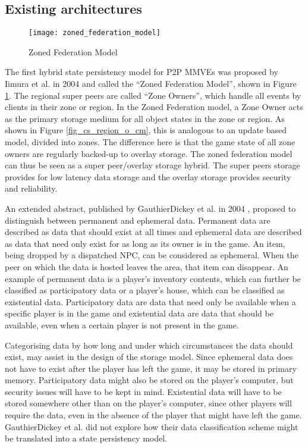 \subsection{Existing architectures}

\begin{figure}[htbp]
 \centering
 \texttt{[image: zoned\_federation\_model]}
 \caption{Zoned Federation Model \cite{zoned_federation}}
 \label{fig_zoned_federation_model}
\end{figure}
%
The first hybrid state persistency model for P2P MMVEs was proposed by Iimura et al. in 2004 \cite{zoned_federation} and called the ``Zoned Federation Model'', shown in Figure \ref{fig_zoned_federation_model}. The regional super peers are called ``Zone Owners'', which handle all events by clients in their zone or region. In the Zoned Federation model, a Zone Owner acts as the primary storage medium for all object states in the zone or region. As shown in Figure \ref{fig_cs_region_o_cm}, this is analogous to an update based model, divided into zones. The difference here is that the game state of all zone owners are regularly backed-up to overlay storage. The zoned federation model can thus be seen as a super peer/overlay storage hybrid. The super peers storage provides for low latency data storage and the overlay storage provides security and reliability.

An extended abstract, published by GauthierDickey et al. in 2004 \cite{hybrid_storage1}, proposed to distinguish between permanent and ephemeral data. Permanent data are described as data that should exist at all times and ephemeral data are described as data that need only exist for as long as its owner is in the game. An item, being dropped by a dispatched NPC, can be considered as ephemeral. When the peer on which the data is hosted leaves the area, that item can disappear. An example of permanent data is a player's inventory contents, which can further be classified as participatory data or a player's house, which can be classified as existential data. Participatory data are data that need only be available when a specific player is in the game and existential data are data that should be available, even when a certain player is not present in the game.

Categorising data by how long and under which circumstances the data should exist, may assist in the design of the storage model. Since ephemeral data does not have to exist after the player has left the game, it may be stored in primary memory. Participatory data might also be stored on the player's computer, but security issues will have to be kept in mind. Existential data will have to be stored somewhere other than on the player's computer, since other players will require the data, even in the absence of the player that might have left the game. GauthierDickey et al. did not explore how their data classification scheme might be translated into a state persistency model.


